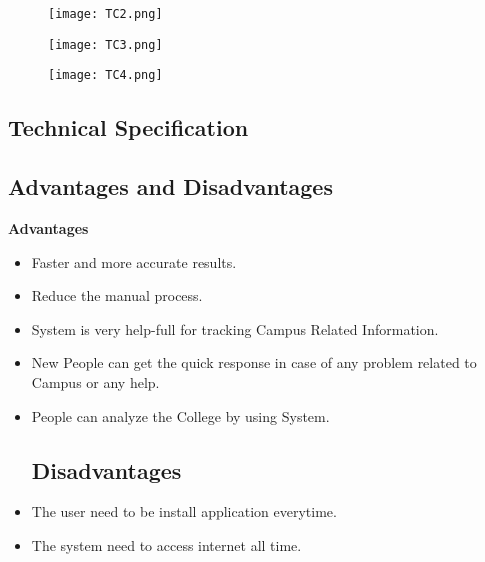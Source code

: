 \documentclass[10pt,a4paper]
{article}
\numberwithin{table}{section}
\begin{document}
{{\begin{normalsize}
\begin{center}
	  \begin{figure}[h]
			\centering
\texttt{[image: TC2.png]}
		\end{figure}
	\end{center}
\begin{center}
	  \begin{figure}[h]
			\centering
\texttt{[image: TC3.png]}
		\end{figure}
	\end{center}

\begin{center}
	  \begin{figure}[h]
			\centering
\texttt{[image: TC4.png]}
		\end{figure}
	\end{center}			

\newpage
\begin{center}
\begin{huge}
\section{Technical Specification}
\end{huge}
\end{center}
\subsection{Advantages and Disadvantages}
\textbf{Advantages}
\begin{itemize}
\item Faster and more accurate results. \\
\item Reduce the manual process.  \\
\item System is very help-full for  tracking  Campus Related Information.\\
\item New People can get the quick response in case of  any problem related to Campus or any help.\\
\item People can analyze the College by using System.\\
\subsection{Disadvantages}
\item The user need to be install application  everytime.
\item The system need to access internet all time.




\end{itemize}
\end{normalsize}}}
\end{document}
